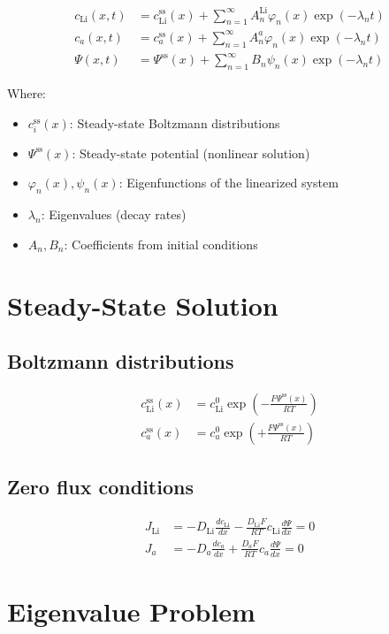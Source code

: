 \documentclass[11pt]{article}
\begin{document}
\begin{align}
c_{\text{Li}}(x,t) &= c_{\text{Li}}^{\text{ss}}(x) + \sum_{n=1}^{\infty} A_n^{\text{Li}} \varphi_n(x) \exp(-\lambda_n t) \\
c_a(x,t) &= c_a^{\text{ss}}(x) + \sum_{n=1}^{\infty} A_n^a \varphi_n(x) \exp(-\lambda_n t) \\
\Psi(x,t) &= \Psi^{\text{ss}}(x) + \sum_{n=1}^{\infty} B_n \psi_n(x) \exp(-\lambda_n t)
\end{align}

Where:
\begin{itemize}
\item $c_i^{\text{ss}}(x)$: Steady-state Boltzmann distributions
\item $\Psi^{\text{ss}}(x)$: Steady-state potential (nonlinear solution)
\item $\varphi_n(x), \psi_n(x)$: Eigenfunctions of the linearized system
\item $\lambda_n$: Eigenvalues (decay rates)
\item $A_n, B_n$: Coefficients from initial conditions
\end{itemize}

\section{Steady-State Solution}

\subsection{Boltzmann distributions}
\begin{align}
c_{\text{Li}}^{\text{ss}}(x) &= c_{\text{Li}}^0 \exp\left(-\frac{F\Psi^{\text{ss}}(x)}{RT}\right) \\
c_a^{\text{ss}}(x) &= c_a^0 \exp\left(+\frac{F\Psi^{\text{ss}}(x)}{RT}\right)
\end{align}

\subsection{Zero flux conditions}
\begin{align}
J_{\text{Li}} &= -D_{\text{Li}}\frac{dc_{\text{Li}}}{dx} - \frac{D_{\text{Li}} F}{RT} c_{\text{Li}} \frac{d\Psi}{dx} = 0 \\
J_a &= -D_a\frac{dc_a}{dx} + \frac{D_a F}{RT} c_a \frac{d\Psi}{dx} = 0
\end{align}

\section{Eigenvalue Problem}
\end{document}
